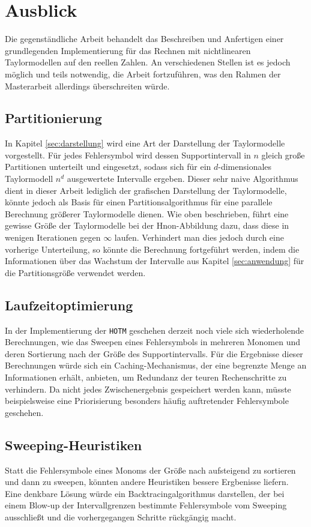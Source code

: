 \section{Ausblick}
Die gegenständliche Arbeit behandelt das Beschreiben und Anfertigen einer grundlegenden Implementierung für das Rechnen mit nichtlinearen Taylormodellen auf den reellen Zahlen. An verschiedenen Stellen ist es jedoch möglich und teils notwendig, die Arbeit fortzuführen, was den Rahmen der Masterarbeit allerdings überschreiten würde.

\subsection*{Partitionierung}
In Kapitel \ref{sec:darstellung} wird eine Art der Darstellung der Taylormodelle vorgestellt. Für jedes Fehlersymbol wird dessen Supportintervall in $n$ gleich große Partitionen unterteilt und eingesetzt, sodass sich für ein $d$-dimensionales Taylormodell $n^d$ ausgewertete Intervalle ergeben. Dieser sehr naive Algorithmus dient in dieser Arbeit lediglich der grafischen Darstellung der Taylormodelle, könnte jedoch als Basis für einen Partitionsalgorithmus für eine parallele Berechnung größerer Taylormodelle dienen. Wie oben beschrieben, führt eine gewisse Größe der Taylormodelle bei der H\e non-Abbildung dazu, dass diese in wenigen Iterationen gegen $\infty$ laufen. Verhindert man dies jedoch durch eine vorherige Unterteilung, so könnte die Berechnung fortgeführt werden, indem die Informationen über das Wachstum der Intervalle aus Kapitel \ref{sec:anwendung} für die Partitionsgröße verwendet werden.


\subsection*{Laufzeitoptimierung} 
In der Implementierung der \verb+HOTM+ geschehen derzeit noch viele sich wiederholende Berechnungen, wie das Sweepen eines Fehlersymbols in mehreren Monomen und deren Sortierung nach der Größe des Supportintervalls. Für die Ergebnisse dieser Berechnungen würde sich ein Caching-Mechanismus, der eine begrenzte Menge an Informationen erhält, anbieten, um Redundanz der teuren Rechenschritte zu verhindern. Da nicht jedes Zwischenergebnis gespeichert werden kann, müsste beispielsweise eine Priorisierung besonders häufig auftretender Fehlersymbole geschehen.


\subsection*{Sweeping-Heuristiken}
Statt die Fehlersymbole eines Monoms der Größe nach aufsteigend zu sortieren und dann zu sweepen, könnten andere Heuristiken bessere Ergbenisse liefern. Eine denkbare Lösung würde ein Backtracingalgorithmus darstellen, der bei einem Blow-up der Intervallgrenzen bestimmte Fehlersymbole vom Sweeping ausschließt und die vorhergegangen Schritte rückgängig macht.


